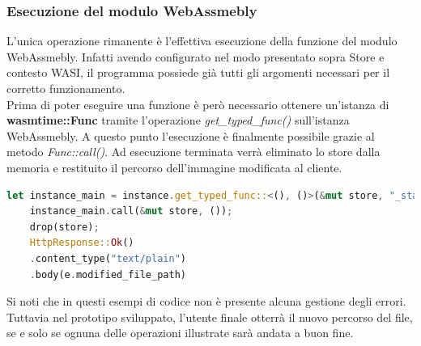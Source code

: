 \subsubsection{Esecuzione del modulo WebAssmebly}
L'unica operazione rimanente è l'effettiva esecuzione della funzione del modulo WebAssmebly.
Infatti avendo configurato nel modo presentato sopra Store e contesto WASI, il programma possiede già tutti gli argomenti necessari per il corretto funzionamento.
\\Prima di poter eseguire una funzione è però necessario ottenere un'istanza di \textbf{wasmtime::Func} tramite l'operazione \emph{get\_typed\_func()} sull'istanza WebAssmebly.
A questo punto l'esecuzione è finalmente possibile grazie al metodo \emph{Func::call()}. Ad esecuzione terminata verrà eliminato lo store dalla memoria e restituito il percorso dell'immagine modificata al cliente.
\begin{lstlisting}[language=rust,caption={File handlers.rs: chiamata a funzione interna al modulo Wasm}, showstringspaces=false]
    let instance_main = instance.get_typed_func::<(), ()>(&mut store, "_start");
    instance_main.call(&mut store, ());
    drop(store);
    HttpResponse::Ok()
    .content_type("text/plain")
    .body(e.modified_file_path)
\end{lstlisting}
Si noti che in questi esempi di codice non è presente alcuna gestione degli errori. Tuttavia nel prototipo sviluppato, l'utente finale otterrà il nuovo percorso del file, se e solo se ognuna delle operazioni illustrate sarà andata a buon fine.
